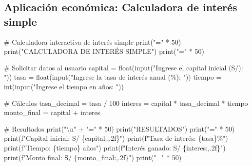 \documentclass[
  doc,
  floatsintext,
  longtable,
  a4paper,
  nolmodern,
  notxfonts,
  notimes,
  12pt,
  colorlinks=true,linkcolor=blue,citecolor=blue,urlcolor=blue]{apa7}
\newenvironment{Shaded}{\begin{snugshade}}{\end{snugshade}}
\newcommand{\BuiltInTok}[1]{\textcolor[rgb]{0.00,0.23,0.31}{#1}}
\newcommand{\CharTok}[1]{\textcolor[rgb]{0.13,0.47,0.30}{#1}}
\newcommand{\CommentTok}[1]{\textcolor[rgb]{0.37,0.37,0.37}{#1}}
\newcommand{\DecValTok}[1]{\textcolor[rgb]{0.68,0.00,0.00}{#1}}
\newcommand{\NormalTok}[1]{\textcolor[rgb]{0.00,0.23,0.31}{#1}}
\newcommand{\OperatorTok}[1]{\textcolor[rgb]{0.37,0.37,0.37}{#1}}
\newcommand{\SpecialCharTok}[1]{\textcolor[rgb]{0.37,0.37,0.37}{#1}}
\newcommand{\SpecialStringTok}[1]{\textcolor[rgb]{0.13,0.47,0.30}{#1}}
\newcommand{\StringTok}[1]{\textcolor[rgb]{0.13,0.47,0.30}{#1}}
\begin{document}
\subsection{Aplicación económica: Calculadora de interés
simple}\label{aplicaciuxf3n-econuxf3mica-calculadora-de-interuxe9s-simple}

\begin{Shaded}
\begin{Highlighting}[]
\CommentTok{\# Calculadora interactiva de interés simple}
\BuiltInTok{print}\NormalTok{(}\StringTok{"="} \OperatorTok{*} \DecValTok{50}\NormalTok{)}
\BuiltInTok{print}\NormalTok{(}\StringTok{"CALCULADORA DE INTERÉS SIMPLE"}\NormalTok{)}
\BuiltInTok{print}\NormalTok{(}\StringTok{"="} \OperatorTok{*} \DecValTok{50}\NormalTok{)}

\CommentTok{\# Solicitar datos al usuario}
\NormalTok{capital }\OperatorTok{=} \BuiltInTok{float}\NormalTok{(}\BuiltInTok{input}\NormalTok{(}\StringTok{"Ingrese el capital inicial (S/): "}\NormalTok{))}
\NormalTok{tasa }\OperatorTok{=} \BuiltInTok{float}\NormalTok{(}\BuiltInTok{input}\NormalTok{(}\StringTok{"Ingrese la tasa de interés anual (\%): "}\NormalTok{))}
\NormalTok{tiempo }\OperatorTok{=} \BuiltInTok{int}\NormalTok{(}\BuiltInTok{input}\NormalTok{(}\StringTok{"Ingrese el tiempo en años: "}\NormalTok{))}

\CommentTok{\# Cálculos}
\NormalTok{tasa\_decimal }\OperatorTok{=}\NormalTok{ tasa }\OperatorTok{/} \DecValTok{100}
\NormalTok{interes }\OperatorTok{=}\NormalTok{ capital }\OperatorTok{*}\NormalTok{ tasa\_decimal }\OperatorTok{*}\NormalTok{ tiempo}
\NormalTok{monto\_final }\OperatorTok{=}\NormalTok{ capital }\OperatorTok{+}\NormalTok{ interes}

\CommentTok{\# Resultados}
\BuiltInTok{print}\NormalTok{(}\StringTok{"}\CharTok{\textbackslash{}n}\StringTok{"} \OperatorTok{+} \StringTok{"="} \OperatorTok{*} \DecValTok{50}\NormalTok{)}
\BuiltInTok{print}\NormalTok{(}\StringTok{"RESULTADOS"}\NormalTok{)}
\BuiltInTok{print}\NormalTok{(}\StringTok{"="} \OperatorTok{*} \DecValTok{50}\NormalTok{)}
\BuiltInTok{print}\NormalTok{(}\SpecialStringTok{f"Capital inicial:  S/ }\SpecialCharTok{\{}\NormalTok{capital}\SpecialCharTok{:,.2f\}}\SpecialStringTok{"}\NormalTok{)}
\BuiltInTok{print}\NormalTok{(}\SpecialStringTok{f"Tasa de interés:  }\SpecialCharTok{\{}\NormalTok{tasa}\SpecialCharTok{\}}\SpecialStringTok{\%"}\NormalTok{)}
\BuiltInTok{print}\NormalTok{(}\SpecialStringTok{f"Tiempo:           }\SpecialCharTok{\{}\NormalTok{tiempo}\SpecialCharTok{\}}\SpecialStringTok{ años"}\NormalTok{)}
\BuiltInTok{print}\NormalTok{(}\SpecialStringTok{f"Interés ganado:   S/ }\SpecialCharTok{\{}\NormalTok{interes}\SpecialCharTok{:,.2f\}}\SpecialStringTok{"}\NormalTok{)}
\BuiltInTok{print}\NormalTok{(}\SpecialStringTok{f"Monto final:      S/ }\SpecialCharTok{\{}\NormalTok{monto\_final}\SpecialCharTok{:,.2f\}}\SpecialStringTok{"}\NormalTok{)}
\BuiltInTok{print}\NormalTok{(}\StringTok{"="} \OperatorTok{*} \DecValTok{50}\NormalTok{)}
\end{Highlighting}
\end{Shaded}
\end{document}
